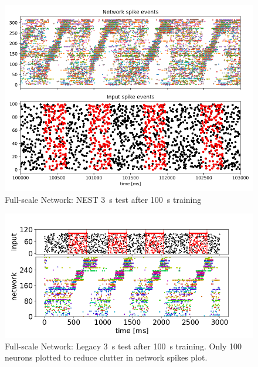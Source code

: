 \begin{figure}[htbp]
    \centering
    \includegraphics[width=\columnwidth]{Figures/nest_full_scale.png}
    \caption{Full-scale Network: NEST \SI{3}{\second} test after \SI{100}{\second} training}
    \label{fig:nest_full_scale}
\end{figure}
\begin{figure}
    \centering
    \includegraphics[width=\columnwidth]{Figures/legacy_full_scale.png}
    \caption{Full-scale Network: Legacy \SI{3}{\second} test after \SI{100}{\second} training. Only 100 neurons plotted to reduce clutter in network spikes plot.}
    \label{fig:legacy_full_scale}
\end{figure}

